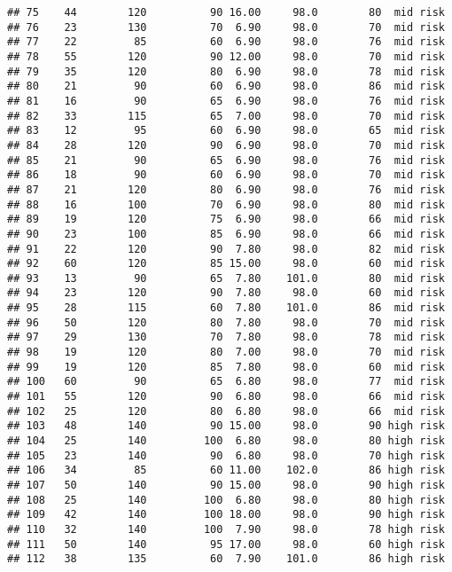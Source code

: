 \documentclass[
  ignorenonframetext,
]{beamer}
\begin{document}
\begin{frame}[fragile]
\begin{verbatim}
## 75    44        120          90 16.00     98.0        80  mid risk
## 76    23        130          70  6.90     98.0        70  mid risk
## 77    22         85          60  6.90     98.0        76  mid risk
## 78    55        120          90 12.00     98.0        70  mid risk
## 79    35        120          80  6.90     98.0        78  mid risk
## 80    21         90          60  6.90     98.0        86  mid risk
## 81    16         90          65  6.90     98.0        76  mid risk
## 82    33        115          65  7.00     98.0        70  mid risk
## 83    12         95          60  6.90     98.0        65  mid risk
## 84    28        120          90  6.90     98.0        70  mid risk
## 85    21         90          65  6.90     98.0        76  mid risk
## 86    18         90          60  6.90     98.0        70  mid risk
## 87    21        120          80  6.90     98.0        76  mid risk
## 88    16        100          70  6.90     98.0        80  mid risk
## 89    19        120          75  6.90     98.0        66  mid risk
## 90    23        100          85  6.90     98.0        66  mid risk
## 91    22        120          90  7.80     98.0        82  mid risk
## 92    60        120          85 15.00     98.0        60  mid risk
## 93    13         90          65  7.80    101.0        80  mid risk
## 94    23        120          90  7.80     98.0        60  mid risk
## 95    28        115          60  7.80    101.0        86  mid risk
## 96    50        120          80  7.80     98.0        70  mid risk
## 97    29        130          70  7.80     98.0        78  mid risk
## 98    19        120          80  7.00     98.0        70  mid risk
## 99    19        120          85  7.80     98.0        60  mid risk
## 100   60         90          65  6.80     98.0        77  mid risk
## 101   55        120          90  6.80     98.0        66  mid risk
## 102   25        120          80  6.80     98.0        66  mid risk
## 103   48        140          90 15.00     98.0        90 high risk
## 104   25        140         100  6.80     98.0        80 high risk
## 105   23        140          90  6.80     98.0        70 high risk
## 106   34         85          60 11.00    102.0        86 high risk
## 107   50        140          90 15.00     98.0        90 high risk
## 108   25        140         100  6.80     98.0        80 high risk
## 109   42        140         100 18.00     98.0        90 high risk
## 110   32        140         100  7.90     98.0        78 high risk
## 111   50        140          95 17.00     98.0        60 high risk
## 112   38        135          60  7.90    101.0        86 high risk

\end{verbatim}
\end{frame}
\end{document}
